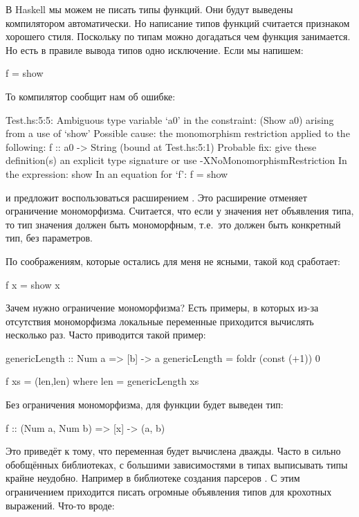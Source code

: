 В Haskell мы можем не писать типы функций. Они будут
выведены компилятором автоматически. Но написание 
типов функций считается признаком хорошего стиля. 
Поскольку по типам можно догадаться чем функция
занимается. Но есть в правиле вывода типов одно исключение. 
Если мы напишем:

\begin{code}
f = show
\end{code}

То компилятор сообщит нам об ошибке:

\begin{code}
Test.hs:5:5:
    Ambiguous type variable `a0' in the constraint:
      (Show a0) arising from a use of `show'
    Possible cause: the monomorphism restriction applied to the following:
      f :: a0 -> String (bound at Test.hs:5:1)
    Probable fix: give these definition(s) an explicit type signature
                  or use -XNoMonomorphismRestriction
    In the expression: show
    In an equation for `f': f = show
\end{code}

\noindent и предложит воспользоваться расширением 
. Это расширение отменяет
ограничение мономорфизма. Считается, что если у значения 
нет объявления типа, то тип значения должен быть мономорфным,
т.е.~это должен быть конкретный тип, без параметров.

По соображениям, которые остались
для меня не ясными, такой код сработает:

\begin{code}
f x = show x
\end{code}

Зачем нужно ограничение мономорфизма? Есть примеры,
в которых из-за отсутствия мономорфизма локальные переменные
приходится вычислять несколько раз. Часто приводится такой пример:

\begin{code}
genericLength :: Num a => [b] -> a
genericLength = foldr (const (+1)) 0 

f xs = (len,len)
     where len = genericLength xs
\end{code}

Без ограничения мономорфизма, для функции 
будет выведен тип:

\begin{code}
f :: (Num a, Num b) => [x] -> (a, b)
\end{code}

Это приведёт к тому, что переменная  
будет вычислена дважды. Часто в сильно обобщённых
библиотеках, с большими зависимостями в типах
выписывать типы крайне неудобно. Например в библиотеке
создания парсеров . С этим ограничением 
приходится писать огромные объявления типов
для крохотных выражений. Что-то вроде:

